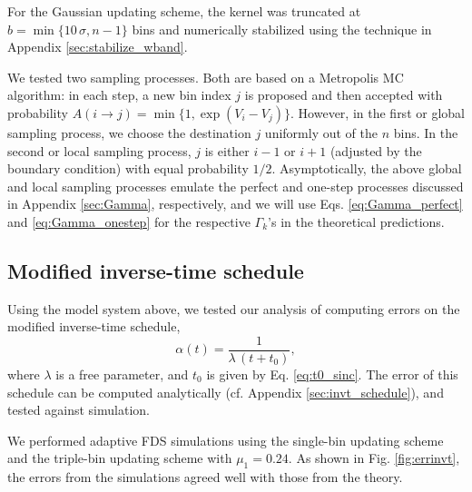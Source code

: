\documentclass[reprint, superscriptaddress, floatfix]{revtex4-1}
\begin{document}
For the Gaussian updating scheme,
the kernel was truncated at
$b = \min\{10 \, \sigma, n - 1\}$ bins
and numerically stabilized
using the technique
in Appendix \ref{sec:stabilize_wband}.



We tested two sampling processes.
%
Both are based on
a Metropolis MC algorithm\cite{
  metropolis1953, newman, frenkel,
  landau_binder}:
%
in each step, a new bin index $j$ is proposed
and then accepted with probability
%
$
A(i \to j) = \min\{ 1, \exp(V_i - V_j) \}.
$
However,
in the first or global sampling process,
we choose the destination $j$
uniformly out of the $n$ bins.
%
In the second or local sampling process,
$j$ is either $i - 1$ or $i + 1$
(adjusted by the boundary condition)
with equal probability $1/2$.
%
Asymptotically,
the above global and local sampling processes
emulate the perfect and one-step processes
discussed in Appendix \ref{sec:Gamma},
respectively,
and we will use
Eqs. \eqref{eq:Gamma_perfect}
and \eqref{eq:Gamma_onestep}
for the respective $\Gamma_k$'s
in the theoretical predictions.
%



\subsection{\label{sec:results_invt}
Modified inverse-time schedule}


Using the model system above, we
tested our analysis of computing errors
on the modified inverse-time schedule,
%
\begin{equation}
\alpha(t) = \frac{1}{\lambda \, (t + t_0) },
\label{eq:alpha_invtlambda}
\end{equation}
%
where $\lambda$ is a free parameter,
and $t_0$ is given by Eq. \eqref{eq:t0_sinc}.
%
The error of this schedule
can be computed analytically
(cf. Appendix \ref{sec:invt_schedule}),
and tested against simulation.



We performed adaptive FDS simulations
using the single-bin updating scheme
and the triple-bin updating scheme with $\mu_1 = 0.24$.
%
%
As shown in Fig. \ref{fig:errinvt},
the errors from the simulations
agreed well with those from the theory.
\end{document}
